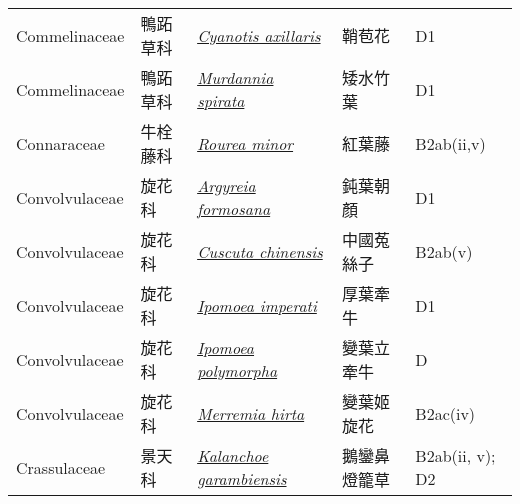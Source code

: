 {\begin{longtable}{L{2.5cm}L{2cm}L{5cm}L{2.5cm}L{3cm}}
    Commelinaceae & 鴨跖草科 & \href{http://www.theplantlist.org/tpl1.1/search?q=Cyanotis+axillaris}{\textit{Cyanotis axillaris} } & 鞘苞花 & D1    \\
    Commelinaceae & 鴨跖草科 & \href{http://www.theplantlist.org/tpl1.1/search?q=Murdannia+spirata}{\textit{Murdannia spirata} } & 矮水竹葉 & D1    \\
    Connaraceae & 牛栓藤科 & \href{http://www.theplantlist.org/tpl1.1/search?q=Rourea+minor}{\textit{Rourea minor} } & 紅葉藤 & B2ab(ii,v)    \\
    Convolvulaceae & 旋花科 & \href{http://www.theplantlist.org/tpl1.1/search?q=Argyreia+formosana}{\textit{Argyreia formosana} } & 鈍葉朝顏 & D1    \\
    Convolvulaceae & 旋花科 & \href{http://www.theplantlist.org/tpl1.1/search?q=Cuscuta+chinensis}{\textit{Cuscuta chinensis} } & 中國菟絲子 & B2ab(v)    \\
    Convolvulaceae & 旋花科 & \href{http://www.theplantlist.org/tpl1.1/search?q=Ipomoea+imperati}{\textit{Ipomoea imperati} } & 厚葉牽牛 & D1    \\
    Convolvulaceae & 旋花科 & \href{http://www.theplantlist.org/tpl1.1/search?q=Ipomoea+polymorpha}{\textit{Ipomoea polymorpha} } & 變葉立牽牛 & D    \\
    Convolvulaceae & 旋花科 & \href{http://www.theplantlist.org/tpl1.1/search?q=Merremia+hirta}{\textit{Merremia hirta} } & 變葉姬旋花 & B2ac(iv)    \\
    Crassulaceae & 景天科 & \href{http://www.theplantlist.org/tpl1.1/search?q=Kalanchoe+garambiensis}{\textit{Kalanchoe garambiensis} } & 鵝鑾鼻燈籠草 & B2ab(ii, v); D2    \\

\end{longtable}}
